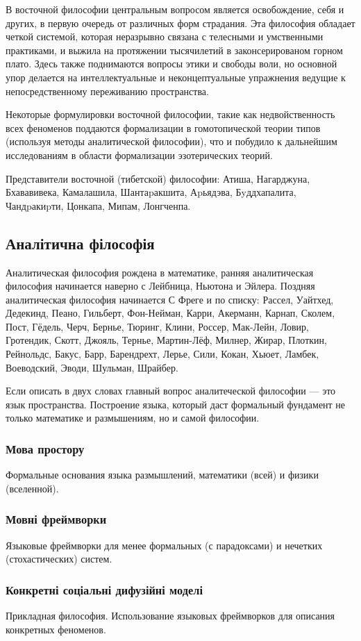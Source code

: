 В восточной философии центральным вопросом является освобождение, себя и других, в первую очередь от различных форм страдания. Эта философия обладает четкой системой, которая неразрывно связана с телесными и умственными практиками, и выжила на протяжении тысячилетий в законсерированом горном плато. Здесь также поднимаются вопросы этики и свободы воли, но основной упор делается на интеллектуальные и неконцептуальные упражнения ведущие к непосредственному переживанию пространства.

Некоторые формулировки восточной философии, такие как недвойственность всех феноменов поддаются формализации в гомотопической теории типов (используя методы аналитической философии), что и побудило к дальнейшим исследованиям в области формализации эзотерических теорий.

Представители восточной (тибетской) философии: Атиша, Нагарджуна, Бхававивека, Камалашила, Шантаpакшита, Аpьядэва, Бyддхапалита, Чандpакиpти, Цонкапа, Мипам, Лонгченпа.

\subsection{Аналітична філософія}

Аналитическая философия рождена в математике, ранняя аналитическая философия начинается наверно с Лейбница, Ньютона и Эйлера. Поздняя аналитическая философия начинается С Фреге и по списку: Рассел, Уайтхед, Дедекинд, Пеано, Гильберт, Фон-Нейман, Карри, Акерманн, Карнап, Сколем, Пост, Гёдель, Черч, Бернье, Тюринг, Клини, Россер, Мак-Лейн, Ловир, Гротендик, Скотт, Джояль, Тернье, Мартин-Лёф, Милнер, Жирар, Плоткин, Рейнольдс, Бакус, Барр, Барендрехт, Лерье, Сили, Кокан, Хьюет, Ламбек, Воеводский, Эводи, Шульман, Шрайбер.

Если описать в двух словах главный вопрос аналитеческой философии --- это язык пространства. Построение языка, который даст формальный фундамент не только математике и размышениям, но и самой философии.

\subsubsection{Мова простору}

Формальные основания языка размышлений, математики (всей) и физики (вселенной).

\subsubsection{Мовні фреймворки}

Языковые фреймворки для менее формальных (с парадоксами) и нечетких (стохастических) систем.

\subsubsection{Конкретні соціальні дифузійні моделі}

Прикладная философия. Использование языковых фреймворков для описания конкретных феноменов.

\normalsize
